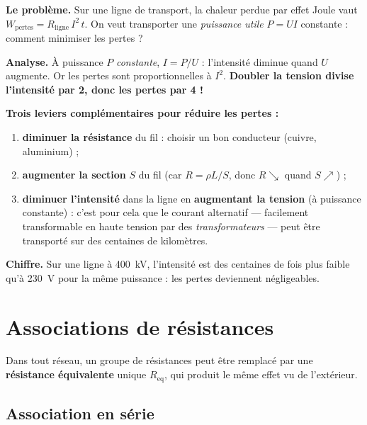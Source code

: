 \documentclass[11pt,a4paper]{article}
\newcommand{\Req}{R_{\mathrm{eq}}}
\begin{document}
\begin{exemple}
\textbf{Le problème.} Sur une ligne de transport, la chaleur perdue par effet Joule vaut
$W_{\mathrm{pertes}} = R_{\mathrm{ligne}}\,I^{2}\,t$. On veut transporter une \emph{puissance utile}
$P=UI$ constante : comment minimiser les pertes ?

\smallskip
\textbf{Analyse.} À puissance $P$ \emph{constante}, $I=P/U$ : l'intensité diminue quand $U$ augmente.
Or les pertes sont proportionnelles à $I^2$. \textbf{Doubler la tension divise l'intensité par 2, donc
les pertes par 4 !}

\textbf{Trois leviers complémentaires pour réduire les pertes :}
\begin{enumerate}[leftmargin=1.8em,topsep=2pt,itemsep=1pt]
  \item \textbf{diminuer la résistance} du fil : choisir un bon conducteur (cuivre, aluminium) ;
  \item \textbf{augmenter la section} $S$ du fil (car $R=\rho L/S$, donc $R\searrow$ quand $S\nearrow$) ;
  \item \textbf{diminuer l'intensité} dans la ligne en \textbf{augmentant la tension} (à puissance
        constante) : c'est pour cela que le courant alternatif — facilement transformable en haute
        tension par des \emph{transformateurs} — peut être transporté sur des centaines de kilomètres.
\end{enumerate}
\textbf{Chiffre.} Sur une ligne à \SI{400}{\kilo\volt}, l'intensité est des centaines de fois plus
faible qu'à \SI{230}{\volt} pour la même puissance : les pertes deviennent négligeables.
\end{exemple}

\section{Associations de résistances}
Dans tout réseau, un groupe de résistances peut être remplacé par une \textbf{résistance
équivalente} unique $\Req$, qui produit le même effet vu de l'extérieur.

\subsection{Association en série}
\end{document}
